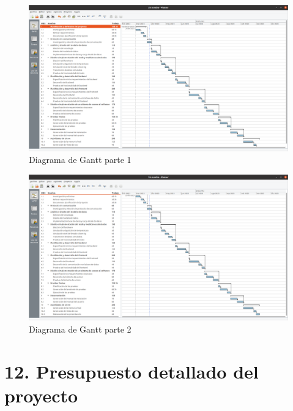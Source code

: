 \documentclass[
11pt, %
]{charter}
\begin{document}
\begin{landscape}
\begin{figure}[htpb]
\centering 
\includegraphics[height=.85\textheight]{./Figuras/DiagramaGant1.png}
\caption{Diagrama de Gantt parte 1}
\label{fig:diagGantt1}
\end{figure}

\end{landscape}

\begin{landscape}
\begin{figure}[htpb]
\centering 
\includegraphics[height=.85\textheight]{./Figuras/DiagramaGant2.png}
\caption{Diagrama de Gantt parte 2}
\label{fig:diagGantt2}
\end{figure}

\end{landscape}


\section{12. Presupuesto detallado del proyecto}
\label{sec:presupuesto}
\end{document}
